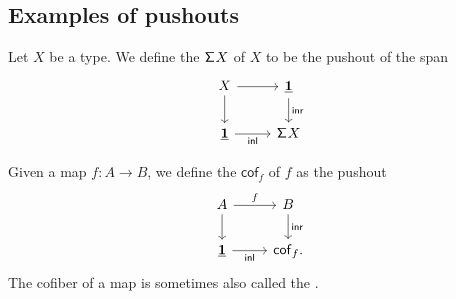 \begin{comment}
\begin{proof}
It is straightforward to verify that the triangle
\begin{equation*}
\begin{tikzcd}
\phantom{T^A \times_{T^S} T^B} & T^X \arrow[dl,swap,"{\mathsf{cocone\usc{}map}(i,j,H)}"] \arrow[dr,"{\mathsf{gap}(\blank\circ i,\blank\circ j, \mathsf{eq\usc{}htpy}(\blank\cdot H))}"] & \phantom{\mathsf{cocone}(T)} \\
\mathsf{cocone}(T) \arrow[rr,swap,"{\mathsf{gap}(i,j,\mathsf{eq\usc{}htpy}(H))}"] & & T^A \times_{T^S} T^B
\end{tikzcd}
\end{equation*}
commutes. Since the bottom map is an equivalence by \cref{lem:cocone_pb}, it follows that if either one of the remaining maps is an equivalence, so is the other. The claim now follows by \cref{thm:is_pullback}.
\end{proof}
\end{comment}

\subsection{Examples of pushouts}

\begin{defn}
Let $X$ be a type. We define the  $\mathsf{\Sigma}^{} X$ of $X$ to be the pushout of the span
\begin{equation*}
\begin{tikzcd}
X \arrow[r] \arrow[d] & \unit \arrow[d,"\inr"] \\
\unit \arrow[r,swap,"\inl"] & \susp X 
\end{tikzcd}
\end{equation*}
\end{defn}

\begin{defn}
Given a map $f:A\to B$, we define the  $\mathsf{cof}_f$ of $f$ as the pushout
\begin{equation*}
\begin{tikzcd}
A \arrow[r,"f"] \arrow[d] & B \arrow[d,"\inr"] \\
\unit \arrow[r,swap,"\inl"] & \mathsf{cof}_f. 
\end{tikzcd}
\end{equation*}
The cofiber of a map is sometimes also called the .
\end{defn}

